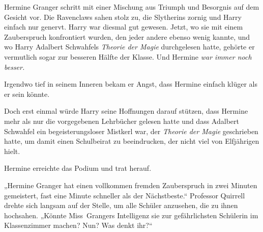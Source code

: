 Hermine Granger schritt mit einer Mischung aus Triumph und Besorgnis auf dem Gesicht vor. Die Ravenclaws sahen stolz zu, die Slytherins zornig und Harry einfach nur genervt. Harry war diesmal gut gewesen. Jetzt, wo sie mit einem Zauberspruch konfrontiert wurden, den jeder andere ebenso wenig kannte, und wo Harry Adalbert Schwahfels \emph{Theorie der Magie} durchgelesen hatte, gehörte er vermutlich sogar zur besseren Hälfte der Klasse. Und Hermine \emph{war immer noch besser.}

Irgendwo tief in seinem Inneren bekam er Angst, dass Hermine einfach klüger als er sein könnte.

Doch erst einmal würde Harry seine Hoffnungen darauf stützen, dass Hermine mehr als nur die vorgegebenen Lehrbücher gelesen hatte und dass Adalbert Schwahfel ein begeisterungsloser Mistkerl war, der \emph{Theorie der Magie} geschrieben hatte, um damit einen Schulbeirat zu beeindrucken, der nicht viel von Elfjährigen hielt.

Hermine erreichte das Podium und trat herauf.

„Hermine Granger hat einen vollkommen fremden Zauberspruch in zwei Minuten gemeistert, fast eine Minute schneller als der Nächstbeste.“ Professor Quirrell drehte sich langsam auf der Stelle, um alle Schüler anzusehen, die zu ihnen hochsahen.
„Könnte Miss~Grangers Intelligenz sie zur gefährlichsten Schülerin im Klassenzimmer machen? Nun? Was denkt ihr?“

